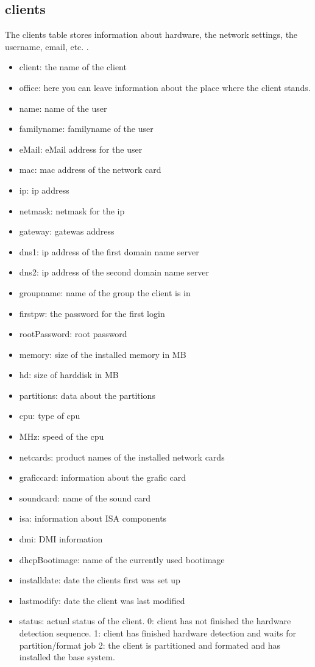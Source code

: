 \subsection{clients}
The clients table stores information about hardware, the network settings, the username, email, etc. .
\begin{itemize}
\item client: the name of the client
\item office: here you can leave information about the place where the client stands.
\item name: name of the user
\item familyname: familyname of the user
\item eMail: eMail address for the user
\item mac: mac address of the network card
\item ip: ip address
\item netmask: netmask for the ip
\item gateway: gatewas address
\item dns1: ip address of the first domain name server 
\item dns2: ip address of the second domain name server 
\item groupname: name of the group the client is in
\item firstpw: the password for the first login
\item rootPassword: root password
\item memory: size of the installed memory in MB
\item hd: size of harddisk in MB
\item partitions: data about the partitions
\item cpu: type of cpu
\item MHz: speed of the cpu
\item netcards: product names of the installed network cards
\item graficcard: information about the grafic card
\item soundcard: name of the sound card
\item isa: information about ISA components
\item dmi: DMI information
\item dhcpBootimage: name of the currently used bootimage
\item installdate: date the clients first was set up
\item lastmodify: date the client was last modified
\item status: actual status of the client. 0: client has not finished the hardware detection sequence. 1: client has finished hardware detection and waits for partition/format job 2: the client is partitioned and formated and has installed the base system.
\end{itemize} 

